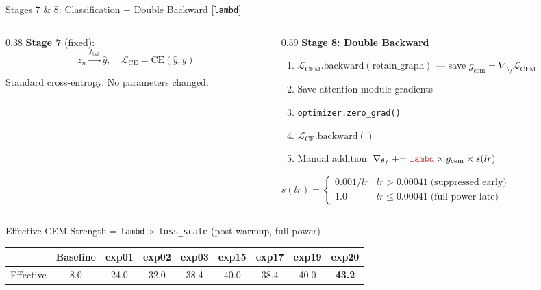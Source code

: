 \documentclass[aspectratio=169, 10pt]{beamer}
\newcommand{\param}[1]{\textcolor{paramred}{\texttt{#1}}}
\newcommand{\good}[1]{\textcolor{goodgreen}{#1}}
\newcommand{\warn}[1]{\textcolor{warnorg}{#1}}
\begin{document}
\begin{frame}{Stages 7 \& 8: Classification + Double Backward \quad\small[\param{lambd}]}

\begin{columns}[T]
\begin{column}{0.38\textwidth}
\textbf{Stage 7} (fixed):
\vspace{-0.1cm}
$$z_n \xrightarrow{f_{\text{tail}}} \hat{y}, \quad \mathcal{L}_{\text{CE}} = \text{CE}(\hat{y}, y)$$

\vspace{0.1cm}
Standard cross-entropy. No parameters changed.
\end{column}
\begin{column}{0.59\textwidth}
\textbf{Stage 8: Double Backward}
\begin{enumerate}
    \scriptsize
    \item $\mathcal{L}_{\text{CEM}}.\text{backward}(\text{retain\_graph})$ --- save $g_{\text{cem}} = \nabla_{\theta_f}\mathcal{L}_{\text{CEM}}$
    \item Save attention module gradients
    \item \texttt{optimizer.zero\_grad()}
    \item $\mathcal{L}_{\text{CE}}.\text{backward}()$
    \item Manual addition: $\nabla_{\theta_f} \mathrel{+}= \param{lambd} \times g_{\text{cem}} \times s(lr)$
\end{enumerate}

\vspace{-0.1cm}
\small
$s(lr) = \begin{cases} 0.001/lr & lr > 0.00041 \;\text{(suppressed early)}\\ 1.0 & lr \leq 0.00041 \;\text{(full power late)}\end{cases}$
\end{column}
\end{columns}

\vspace{0.15cm}
\begin{block}{Effective CEM Strength = \param{lambd} $\times$ \param{loss\_scale} \quad(post-warmup, full power)}
\centering
\scriptsize
\begin{tabular}{ccccccccc}
\toprule
& Baseline & exp01 & exp02 & exp03 & exp15 & exp17 & exp19 & \textbf{exp20} \\
\midrule
Effective & \warn{8.0} & 24.0 & 32.0 & 38.4 & \good{40.0} & 38.4 & \good{40.0} & \good{\textbf{43.2}} \\
\bottomrule
\end{tabular}
\end{block}

\end{frame}
\end{document}
